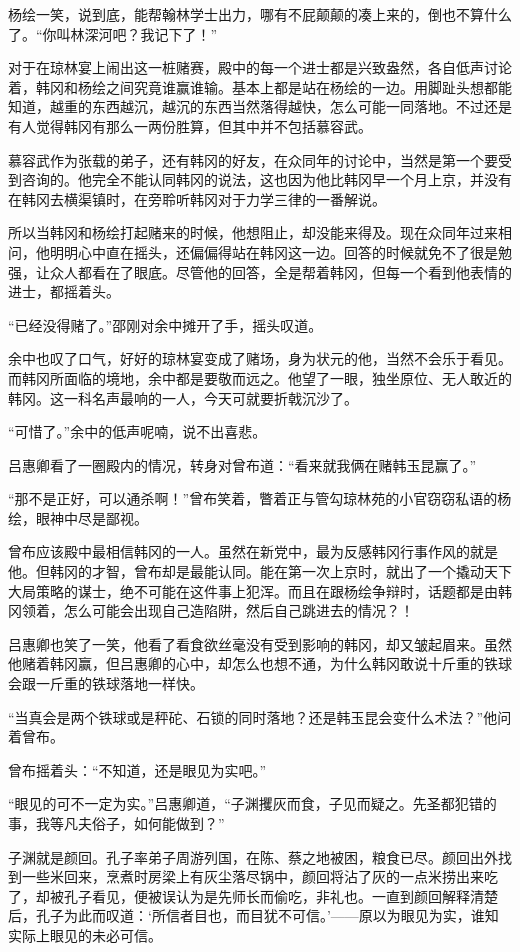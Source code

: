 杨绘一笑，说到底，能帮翰林学士出力，哪有不屁颠颠的凑上来的，倒也不算什么了。“你叫林深河吧？我记下了！”

对于在琼林宴上闹出这一桩赌赛，殿中的每一个进士都是兴致盎然，各自低声讨论着，韩冈和杨绘之间究竟谁赢谁输。基本上都是站在杨绘的一边。用脚趾头想都能知道，越重的东西越沉，越沉的东西当然落得越快，怎么可能一同落地。不过还是有人觉得韩冈有那么一两份胜算，但其中并不包括慕容武。

慕容武作为张载的弟子，还有韩冈的好友，在众同年的讨论中，当然是第一个要受到咨询的。他完全不能认同韩冈的说法，这也因为他比韩冈早一个月上京，并没有在韩冈去横渠镇时，在旁聆听韩冈对于力学三律的一番解说。

所以当韩冈和杨绘打起赌来的时候，他想阻止，却没能来得及。现在众同年过来相问，他明明心中直在摇头，还偏偏得站在韩冈这一边。回答的时候就免不了很是勉强，让众人都看在了眼底。尽管他的回答，全是帮着韩冈，但每一个看到他表情的进士，都摇着头。

“已经没得赌了。”邵刚对余中摊开了手，摇头叹道。

余中也叹了口气，好好的琼林宴变成了赌场，身为状元的他，当然不会乐于看见。而韩冈所面临的境地，余中都是要敬而远之。他望了一眼，独坐原位、无人敢近的韩冈。这一科名声最响的一人，今天可就要折戟沉沙了。

“可惜了。”余中的低声呢喃，说不出喜悲。

吕惠卿看了一圈殿内的情况，转身对曾布道：“看来就我俩在赌韩玉昆赢了。”

“那不是正好，可以通杀啊！”曾布笑着，瞥着正与管勾琼林苑的小官窃窃私语的杨绘，眼神中尽是鄙视。

曾布应该殿中最相信韩冈的一人。虽然在新党中，最为反感韩冈行事作风的就是他。但韩冈的才智，曾布却是最能认同。能在第一次上京时，就出了一个撬动天下大局策略的谋士，绝不可能在这件事上犯浑。而且在跟杨绘争辩时，话题都是由韩冈领着，怎么可能会出现自己造陷阱，然后自己跳进去的情况？！

吕惠卿也笑了一笑，他看了看食欲丝毫没有受到影响的韩冈，却又皱起眉来。虽然他赌着韩冈赢，但吕惠卿的心中，却怎么也想不通，为什么韩冈敢说十斤重的铁球会跟一斤重的铁球落地一样快。

“当真会是两个铁球或是秤砣、石锁的同时落地？还是韩玉昆会变什么术法？”他问着曾布。

曾布摇着头：“不知道，还是眼见为实吧。”

“眼见的可不一定为实。”吕惠卿道，“子渊攫灰而食，子见而疑之。先圣都犯错的事，我等凡夫俗子，如何能做到？”

子渊就是颜回。孔子率弟子周游列国，在陈、蔡之地被困，粮食已尽。颜回出外找到一些米回来，烹煮时房梁上有灰尘落尽锅中，颜回将沾了灰的一点米捞出来吃了，却被孔子看见，便被误认为是先师长而偷吃，非礼也。一直到颜回解释清楚后，孔子为此而叹道：‘所信者目也，而目犹不可信。’——原以为眼见为实，谁知实际上眼见的未必可信。

